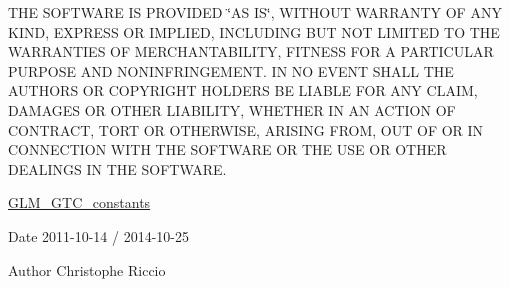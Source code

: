 T\-H\-E S\-O\-F\-T\-W\-A\-R\-E I\-S P\-R\-O\-V\-I\-D\-E\-D \char`\"{}\-A\-S I\-S\char`\"{}, W\-I\-T\-H\-O\-U\-T W\-A\-R\-R\-A\-N\-T\-Y O\-F A\-N\-Y K\-I\-N\-D, E\-X\-P\-R\-E\-S\-S O\-R I\-M\-P\-L\-I\-E\-D, I\-N\-C\-L\-U\-D\-I\-N\-G B\-U\-T N\-O\-T L\-I\-M\-I\-T\-E\-D T\-O T\-H\-E W\-A\-R\-R\-A\-N\-T\-I\-E\-S O\-F M\-E\-R\-C\-H\-A\-N\-T\-A\-B\-I\-L\-I\-T\-Y, F\-I\-T\-N\-E\-S\-S F\-O\-R A P\-A\-R\-T\-I\-C\-U\-L\-A\-R P\-U\-R\-P\-O\-S\-E A\-N\-D N\-O\-N\-I\-N\-F\-R\-I\-N\-G\-E\-M\-E\-N\-T. I\-N N\-O E\-V\-E\-N\-T S\-H\-A\-L\-L T\-H\-E A\-U\-T\-H\-O\-R\-S O\-R C\-O\-P\-Y\-R\-I\-G\-H\-T H\-O\-L\-D\-E\-R\-S B\-E L\-I\-A\-B\-L\-E F\-O\-R A\-N\-Y C\-L\-A\-I\-M, D\-A\-M\-A\-G\-E\-S O\-R O\-T\-H\-E\-R L\-I\-A\-B\-I\-L\-I\-T\-Y, W\-H\-E\-T\-H\-E\-R I\-N A\-N A\-C\-T\-I\-O\-N O\-F C\-O\-N\-T\-R\-A\-C\-T, T\-O\-R\-T O\-R O\-T\-H\-E\-R\-W\-I\-S\-E, A\-R\-I\-S\-I\-N\-G F\-R\-O\-M, O\-U\-T O\-F O\-R I\-N C\-O\-N\-N\-E\-C\-T\-I\-O\-N W\-I\-T\-H T\-H\-E S\-O\-F\-T\-W\-A\-R\-E O\-R T\-H\-E U\-S\-E O\-R O\-T\-H\-E\-R D\-E\-A\-L\-I\-N\-G\-S I\-N T\-H\-E S\-O\-F\-T\-W\-A\-R\-E.

\hyperlink{group__gtc__constants}{G\-L\-M\-\_\-\-G\-T\-C\-\_\-constants}

\begin{DoxyDate}{Date}
2011-\/10-\/14 / 2014-\/10-\/25 
\end{DoxyDate}
\begin{DoxyAuthor}{Author}
Christophe Riccio 
\end{DoxyAuthor}

